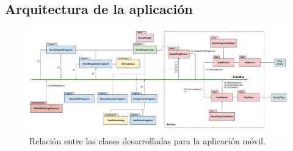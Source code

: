 \subsection{Arquitectura de la aplicación}
\label{subsec:arquitectura_app}

\begin{figure}[h]
	\centering
	\includegraphics[width=14cm]{./Figures/3_3_2_app-arquitectura.pdf}
	\caption{Relación entre las clases desarrolladas para la aplicación móvil.}
	\label{fig:app_arquitectura}
\end{figure}



